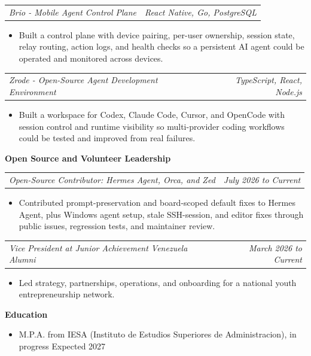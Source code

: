 \documentclass[10pt,letterpaper]{article}
\makeatletter
\newcommand{\bodyfont}{\fontsize{10.5}{15.75}\selectfont}
\newcommand{\sectiontitle}[1]{%
  \vspace{4pt}
  {\bodyfont\textbf{#1}}\par
  \nopagebreak[4]
  \vspace{2pt}
}
\newcommand{\roleline}[2]{%
  \begin{tabularx}{\textwidth}{@{}Xr@{}}
    \bodyfont\textit{#1} & \bodyfont\textit{#2}
  \end{tabularx}
  \nopagebreak[4]
  \vspace{1pt}
}
\makeatother
\begin{document}
\vspace{3pt}
\roleline{Brio - Mobile Agent Control Plane}{React Native, Go, PostgreSQL}
\begin{itemize}
  \item Built a control plane with device pairing, per-user ownership, session state, relay routing, action logs, and health checks so a persistent AI agent could be operated and monitored across devices.
\end{itemize}

\vspace{3pt}
\roleline{Zrode - Open-Source Agent Development Environment}{TypeScript, React, Node.js}
\begin{itemize}
  \item Built a workspace for Codex, Claude Code, Cursor, and OpenCode with session control and runtime visibility so multi-provider coding workflows could be tested and improved from real failures.
\end{itemize}

\sectiontitle{Open Source and Volunteer Leadership}

\roleline{Open-Source Contributor: Hermes Agent, Orca, and Zed}{July 2026 to Current}
\begin{itemize}
  \item Contributed prompt-preservation and board-scoped default fixes to Hermes Agent, plus Windows agent setup, stale SSH-session, and editor fixes through public issues, regression tests, and maintainer review.
\end{itemize}

\vspace{3pt}
\roleline{Vice President at Junior Achievement Venezuela Alumni}{March 2026 to Current}
\begin{itemize}
  \item Led strategy, partnerships, operations, and onboarding for a national youth entrepreneurship network.
\end{itemize}

\sectiontitle{Education}
\begin{itemize}
  \item M.P.A. from IESA (Instituto de Estudios Superiores de Administracion), in progress \hfill Expected 2027
\end{itemize}
\end{document}
